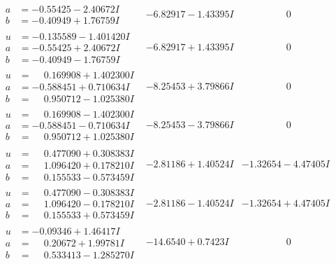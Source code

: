 \documentclass[1p]{elsarticle_modified}
\theoremstyle{definition}
\begin{document}
$$\begin{array}{c|c|c}
\begin{aligned}
a &= -0.55425 - 2.40672 I \\
b &= -0.40949 + 1.76759 I\end{aligned}
 & -6.82917 - 1.43395 I & \phantom{-0.000000 } 0 \\ \hline\begin{aligned}
u &= -0.135589 - 1.401420 I \\
a &= -0.55425 + 2.40672 I \\
b &= -0.40949 - 1.76759 I\end{aligned}
 & -6.82917 + 1.43395 I & \phantom{-0.000000 } 0 \\ \hline\begin{aligned}
u &= \phantom{-}0.169908 + 1.402300 I \\
a &= -0.588451 + 0.710634 I \\
b &= \phantom{-}0.950712 - 1.025380 I\end{aligned}
 & -8.25453 + 3.79866 I & \phantom{-0.000000 } 0 \\ \hline\begin{aligned}
u &= \phantom{-}0.169908 - 1.402300 I \\
a &= -0.588451 - 0.710634 I \\
b &= \phantom{-}0.950712 + 1.025380 I\end{aligned}
 & -8.25453 - 3.79866 I & \phantom{-0.000000 } 0 \\ \hline\begin{aligned}
u &= \phantom{-}0.477090 + 0.308383 I \\
a &= \phantom{-}1.096420 + 0.178210 I \\
b &= \phantom{-}0.155533 - 0.573459 I\end{aligned}
 & -2.81186 + 1.40524 I & -1.32654 - 4.47405 I \\ \hline\begin{aligned}
u &= \phantom{-}0.477090 - 0.308383 I \\
a &= \phantom{-}1.096420 - 0.178210 I \\
b &= \phantom{-}0.155533 + 0.573459 I\end{aligned}
 & -2.81186 - 1.40524 I & -1.32654 + 4.47405 I \\ \hline\begin{aligned}
u &= -0.09346 + 1.46417 I \\
a &= \phantom{-}0.20672 + 1.99781 I \\
b &= \phantom{-}0.533413 - 1.285270 I\end{aligned}
 & -14.6540 + 0.7423 I & \phantom{-0.000000 } 0 \\ \hline\begin{aligned}

\end{aligned}
\end{array}$$
\end{document}

